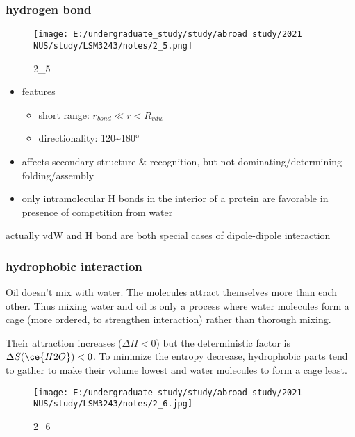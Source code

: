 \documentclass[]{article}
\begin{document}
\hypertarget{hydrogen-bond-1}{%
\subsubsection{hydrogen bond}\label{hydrogen-bond-1}}

\begin{figure}
\centering
\texttt{[image: E:/undergraduate\_study/study/abroad study/2021 NUS/study/LSM3243/notes/2\_5.png]}
\caption{2\_5}
\end{figure}

\begin{itemize}
\item
  features

  \begin{itemize}
  \item
    short range: \(r_{bond}\ll r<R_{vdw}\)
  \item
    directionality: 120\textasciitilde{}180°
  \end{itemize}
\item
  affects secondary structure \& recognition, but not
  dominating/determining folding/assembly
\item
  only intramolecular H bonds in the interior of a protein are favorable
  in presence of competition from water
\end{itemize}

actually vdW and H bond are both special cases of dipole-dipole
interaction

\hypertarget{hydrophobic-interaction}{%
\subsubsection{hydrophobic interaction}\label{hydrophobic-interaction}}

Oil doesn't mix with water. The molecules attract themselves more than
each other. Thus mixing water and oil is only a process where water
molecules form a cage (more ordered, to strengthen interaction) rather
than thorough mixing.

Their attraction increases (\(\Delta H<0\)) but the deterministic factor
is \(\Delta S(\ce{H2O})<0\). To minimize the entropy decrease,
hydrophobic parts tend to gather to make their volume lowest and water
molecules to form a cage least.

\begin{figure}
\centering
\texttt{[image: E:/undergraduate\_study/study/abroad study/2021 NUS/study/LSM3243/notes/2\_6.jpg]}
\caption{2\_6}
\end{figure}
\end{document}
